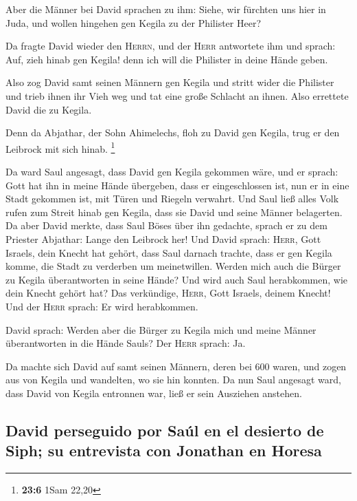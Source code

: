  Aber die Männer bei David sprachen zu ihm: Siehe, wir
fürchten uns hier in Juda, und wollen hingehen gen Kegila zu der
Philister Heer?

 Da fragte David wieder den \textsc{Herrn}, und der
\textsc{Herr} antwortete ihm und sprach: Auf, zieh hinab gen Kegila!
denn ich will die Philister in deine Hände geben.

 Also zog David samt seinen Männern gen Kegila und stritt
wider die Philister und trieb ihnen ihr Vieh weg und tat eine große
Schlacht an ihnen. Also errettete David die zu Kegila.

 Denn da Abjathar, der Sohn Ahimelechs, floh zu David gen
Kegila, trug er den Leibrock mit sich hinab. \footnote{\textbf{23:6}
  1Sam 22,20}

 Da ward Saul angesagt, dass David gen Kegila gekommen
wäre, und er sprach: Gott hat ihn in meine Hände übergeben, dass er
eingeschlossen ist, nun er in eine Stadt gekommen ist, mit Türen und
Riegeln verwahrt.  Und Saul ließ alles Volk rufen zum
Streit hinab gen Kegila, dass sie David und seine Männer belagerten.
 Da aber David merkte, dass Saul Böses über ihn gedachte,
sprach er zu dem Priester Abjathar: Lange den Leibrock her!
 Und David sprach: \textsc{Herr}, Gott Israels, dein
Knecht hat gehört, dass Saul darnach trachte, dass er gen Kegila komme,
die Stadt zu verderben um meinetwillen.  Werden mich auch
die Bürger zu Kegila überantworten in seine Hände? Und wird auch Saul
herabkommen, wie dein Knecht gehört hat? Das verkündige, \textsc{Herr},
Gott Israels, deinem Knecht! Und der \textsc{Herr} sprach: Er wird
herabkommen.

 David sprach: Werden aber die Bürger zu Kegila mich und
meine Männer überantworten in die Hände Sauls? Der \textsc{Herr} sprach:
Ja.

 Da machte sich David auf samt seinen Männern, deren bei
600 waren, und zogen aus von Kegila und wandelten, wo sie hin konnten.
Da nun Saul angesagt ward, dass David von Kegila entronnen war, ließ er
sein Ausziehen anstehen.

\hypertarget{david-perseguido-por-sauxfal-en-el-desierto-de-siph-su-entrevista-con-jonathan-en-horesa}{%
\subsection{David perseguido por Saúl en el desierto de Siph; su
entrevista con Jonathan en
Horesa}\label{david-perseguido-por-sauxfal-en-el-desierto-de-siph-su-entrevista-con-jonathan-en-horesa}}


